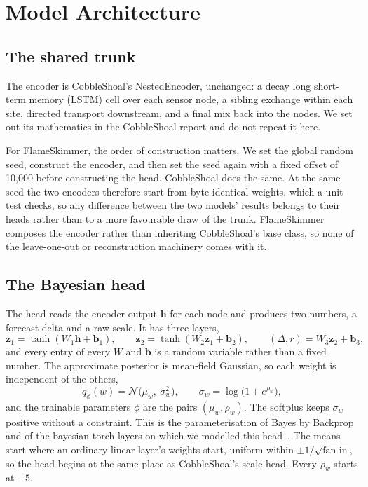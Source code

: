 \documentclass{article}
\begin{document}
\section{Model Architecture}
\label{sec:architecture}

\subsection{The shared trunk}
\label{sec:trunk}

The encoder is CobbleShoal's NestedEncoder, unchanged: a decay long short-term
memory (LSTM) cell over each sensor node, a sibling exchange within each site,
directed transport downstream, and a final mix back into the nodes. We set out
its mathematics in the CobbleShoal report and do not repeat it here.

For FlameSkimmer, the order of construction matters. We set the global random
seed, construct the encoder, and then set the seed again with a fixed offset
of 10{,}000 before constructing the head. CobbleShoal does the same. At the
same seed the two encoders therefore start from byte-identical weights, which a
unit test checks, so any difference between the two models' results belongs to
their heads rather than to a more favourable draw of the trunk. FlameSkimmer
composes the encoder rather than inheriting CobbleShoal's base class, so none
of the leave-one-out or reconstruction machinery comes with it.

\subsection{The Bayesian head}
\label{sec:head}

The head reads the encoder output $\bm{h}$ for each node and produces two
numbers, a forecast delta and a raw scale. It has three layers,
\begin{equation}
  \bm{z}_{1} = \tanh(W_{1}\bm{h} + \bm{b}_{1}), \qquad
  \bm{z}_{2} = \tanh(W_{2}\bm{z}_{1} + \bm{b}_{2}), \qquad
  (\Delta, r) = W_{3}\bm{z}_{2} + \bm{b}_{3},
\end{equation}
and every entry of every $W$ and $\bm{b}$ is a random variable rather than a
fixed number. The approximate posterior is mean-field Gaussian, so each weight
is independent of the others,
\begin{equation}
  q_{\phi}(w) = \mathcal{N}\big(\mu_{w},\ \sigma_{w}^{2}\big), \qquad
  \sigma_{w} = \log\big(1 + e^{\rho_{w}}\big),
\end{equation}
and the trainable parameters $\phi$ are the pairs $(\mu_{w}, \rho_{w})$. The
softplus keeps $\sigma_{w}$ positive without a constraint. This is the
parameterisation of Bayes by Backprop~\citep{blundell2015weight} and of the
bayesian-torch layers on which we modelled this
head~\citep{krishnan2022bayesiantorch}. The means start where an ordinary
linear layer's weights start, uniform within $\pm 1/\sqrt{\text{fan in}}$, so
the head begins at the same place as CobbleShoal's scale head. Every
$\rho_{w}$ starts at $-5$.
\end{document}
